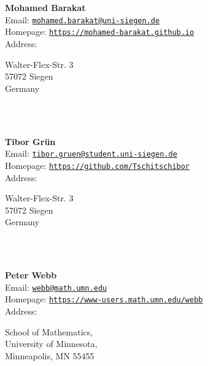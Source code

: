 \documentclass[a4paper,11pt]{report}
\newcommand{\logpage}[1]{\protect\write\pagenrlog{#1, \thepage,}}
\begin{document}
\begin{titlepage}
\mbox{}\\
{\mbox{}\\
\small \noindent \textbf{ Mohamed Barakat\\
    }  Email: \href{mailto://mohamed.barakat@uni-siegen.de} {\texttt{mohamed.barakat@uni-siegen.de}}\\
  Homepage: \href{https://mohamed-barakat.github.io} {\texttt{https://mohamed-barakat.github.io}}\\
  Address: \begin{minipage}[t]{8cm}\noindent
 Walter-Flex-Str. 3\\
 57072 Siegen\\
 Germany\\
 \end{minipage}
}\\
{\mbox{}\\
\small \noindent \textbf{ Tibor Gr{\"u}n\\
    }  Email: \href{mailto://tibor.gruen@student.uni-siegen.de} {\texttt{tibor.gruen@student.uni-siegen.de}}\\
  Homepage: \href{https://github.com/Tschitschibor} {\texttt{https://github.com/Tschitschibor}}\\
  Address: \begin{minipage}[t]{8cm}\noindent
 Walter-Flex-Str. 3\\
 57072 Siegen\\
 Germany\\
 \end{minipage}
}\\
{\mbox{}\\
\small \noindent \textbf{ Peter Webb\\
    }  Email: \href{mailto://webb@math.umn.edu} {\texttt{webb@math.umn.edu}}\\
  Homepage: \href{https://www-users.math.umn.edu/~webb} {\texttt{https://www-users.math.umn.edu/\texttt{}webb}}\\
  Address: \begin{minipage}[t]{8cm}\noindent
 School of Mathematics,\\
 University of Minnesota,\\
 Minneapolis, MN 55455\\
 \end{minipage}
}\\
\end{titlepage}

\newpage\setcounter{page}{2}
\newpage

\def\contentsname{Contents\logpage{[ 0, 0, 1 ]}}
\end{document}
